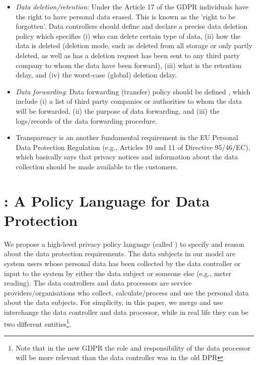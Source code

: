 \documentclass[a4paper]{article}
\begin{document}
\begin{itemize}
\item \textit{Data deletion/retention}: Under the Article 17 of the GDPR \cite{ico3} individuals have the right to have personal data erased. This is known as the 'right to be forgotten'. Data controllers should define and declare a precise data deletion policy which specifies (i) who can delete certain type of data, (ii) how the data is deleted (deletion mode, such as deleted from all storage or only partly deleted, as well as has a deletion request has been sent to any third party company to whom the data have been forward), (iii) what is the retention delay, and (iv) the worst-case (global) deletion delay.      




\item \textit{Data forwarding}: Data forwarding (transfer) policy should be defined \cite{ButinTN15, d95}, which include (i) a list of third party companies or authorities to whom the data will be forwarded, (ii) the purpose of data  forwarding, and (iii) the logs/records of the data forwarding procedure.      

\item Transparency is an another fundamental requirement in the EU Personal Data Protection Regulation (e.g., Articles 10 and 11 of Directive 95/46/EC)\cite{EUtrans, d95}, which basically says that privacy notices and information about the data collection should be made available to the customers. 



\end{itemize}
\section{ : A Policy Language for Data Protection}
\label{sec:polgen} 
We propose a high-level privacy policy language (called ) to specify and reason about the data protection requirements. The data subjects in our model are system users whose personal data has been collected by the data controller or input to the system by either the data subject or someone else (e.g., meter reading). The data controllers and data processors are service providers/organisations who collect, calculate/process and use the personal data about the data subjects.  For simplicity, in this paper, we merge and use interchange the data controller and data processor, while in real life they can be two different entities\footnote{Note that in the new GDPR the role and responsibility of the data processor will be more relevant than the data controller was in the old DPR}.  
\end{document}
